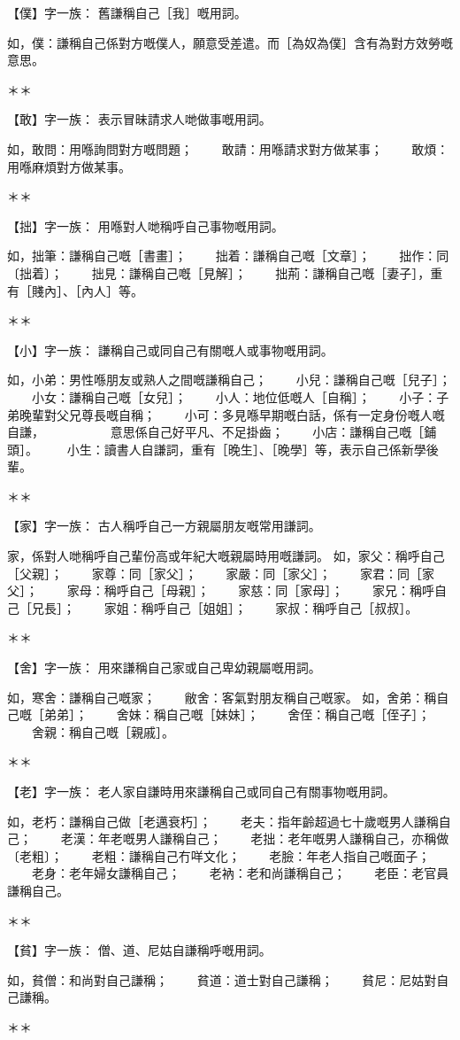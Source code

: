   
【僕】字一族：  
舊謙稱自己［我］嘅用詞。

如，僕：謙稱自己係對方嘅僕人，願意受差遣。而［為奴為僕］含有為對方效勞嘅意思。

  
＊＊

  
【敢】字一族：  
表示冒昧請求人哋做事嘅用詞。

如，敢問：用喺詢問對方嘅問題；  
　　敢請：用喺請求對方做某事；  
　　敢煩：用喺麻煩對方做某事。  
  
＊＊  
  
【拙】字一族：  
用喺對人哋稱呼自己事物嘅用詞。

如，拙筆：謙稱自己嘅［書畫］；  
　　拙着：謙稱自己嘅［文章］；  
　　拙作：同〔拙着〕；  
　　拙見：謙稱自己嘅［見解］；  
　　拙荊：謙稱自己嘅［妻子］，重有［賤內］、［內人］等。  
  
＊＊  
  
【小】字一族：  
謙稱自己或同自己有關嘅人或事物嘅用詞。

如，小弟：男性喺朋友或熟人之間嘅謙稱自己；  
　　小兒：謙稱自己嘅［兒子］；  
　　小女：謙稱自己嘅［女兒］；  
　　小人：地位低嘅人［自稱］；  
　　小子：子弟晚輩對父兄尊長嘅自稱；  
　　小可：多見喺早期嘅白話，係有一定身份嘅人嘅自謙，  
　　　　　意思係自己好平凡、不足掛齒；  
　　小店：謙稱自己嘅［鋪頭］。  
　　小生：讀書人自謙詞，重有［晚生］、［晚學］等，表示自己係新學後輩。  
  
＊＊  
  
【家】字一族：  
古人稱呼自己一方親屬朋友嘅常用謙詞。

家，係對人哋稱呼自己輩份高或年紀大嘅親屬時用嘅謙詞。  
如，家父：稱呼自己［父親］；  
　　家尊：同［家父］；  
　　家嚴：同［家父］；  
　　家君：同［家父］；  
　　家母：稱呼自己［母親］；  
　　家慈：同［家母］；  
　　家兄：稱呼自己［兄長］；  
　　家姐：稱呼自己［姐姐］；  
　　家叔：稱呼自己［叔叔］。  
  
＊＊  
  
【舍】字一族：  
用來謙稱自己家或自己卑幼親屬嘅用詞。

如，寒舍：謙稱自己嘅家；  
　　敝舍：客氣對朋友稱自己嘅家。  
如，舍弟：稱自己嘅［弟弟］；  
　　舍妹：稱自己嘅［妹妹］；  
　　舍侄：稱自己嘅［侄子］；  
　　舍親：稱自己嘅［親戚］。  
  
＊＊  
  
【老】字一族：  
老人家自謙時用來謙稱自己或同自己有關事物嘅用詞。

如，老朽：謙稱自己做［老邁衰朽］；  
　　老夫：指年齡超過七十歲嘅男人謙稱自己；  
　　老漢：年老嘅男人謙稱自己；  
　　老拙：老年嘅男人謙稱自己，亦稱做〔老粗〕；  
　　老粗：謙稱自己冇咩文化；  
　　老臉：年老人指自己嘅面子；  
　　老身：老年婦女謙稱自己；  
　　老衲：老和尚謙稱自己；  
　　老臣：老官員謙稱自己。  
  
＊＊  
  
【貧】字一族：  
僧、道、尼姑自謙稱呼嘅用詞。

如，貧僧：和尚對自己謙稱；  
　　貧道：道士對自己謙稱；  
　　貧尼：尼姑對自己謙稱。  
  
＊＊  
  